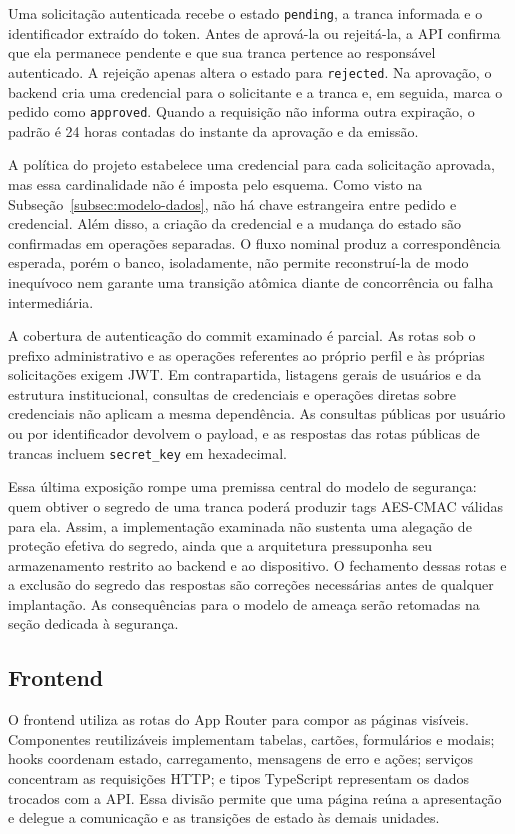 Uma solicitação autenticada recebe o estado \texttt{pending}, a tranca informada e o identificador extraído do token. Antes de aprová-la ou rejeitá-la, a API confirma que ela permanece pendente e que sua tranca pertence ao responsável autenticado. A rejeição apenas altera o estado para \texttt{rejected}. Na aprovação, o backend cria uma credencial para o solicitante e a tranca e, em seguida, marca o pedido como \texttt{approved}. Quando a requisição não informa outra expiração, o padrão é 24 horas contadas do instante da aprovação e da emissão.

A política do projeto estabelece uma credencial para cada solicitação aprovada, mas essa cardinalidade não é imposta pelo esquema. Como visto na Subseção~\ref{subsec:modelo-dados}, não há chave estrangeira entre pedido e credencial. Além disso, a criação da credencial e a mudança do estado são confirmadas em operações separadas. O fluxo nominal produz a correspondência esperada, porém o banco, isoladamente, não permite reconstruí-la de modo inequívoco nem garante uma transição atômica diante de concorrência ou falha intermediária.

A cobertura de autenticação do commit examinado é parcial. As rotas sob o prefixo administrativo e as operações referentes ao próprio perfil e às próprias solicitações exigem JWT. Em contrapartida, listagens gerais de usuários e da estrutura institucional, consultas de credenciais e operações diretas sobre credenciais não aplicam a mesma dependência. As consultas públicas por usuário ou por identificador devolvem o payload, e as respostas das rotas públicas de trancas incluem \texttt{secret\_key} em hexadecimal.

Essa última exposição rompe uma premissa central do modelo de segurança: quem obtiver o segredo de uma tranca poderá produzir tags AES-CMAC válidas para ela. Assim, a implementação examinada não sustenta uma alegação de proteção efetiva do segredo, ainda que a arquitetura pressuponha seu armazenamento restrito ao backend e ao dispositivo. O fechamento dessas rotas e a exclusão do segredo das respostas são correções necessárias antes de qualquer implantação. As consequências para o modelo de ameaça serão retomadas na seção dedicada à segurança.

\subsection{Frontend}

O frontend utiliza as rotas do App Router para compor as páginas visíveis. Componentes reutilizáveis implementam tabelas, cartões, formulários e modais; hooks coordenam estado, carregamento, mensagens de erro e ações; serviços concentram as requisições HTTP; e tipos TypeScript representam os dados trocados com a API. Essa divisão permite que uma página reúna a apresentação e delegue a comunicação e as transições de estado às demais unidades.

